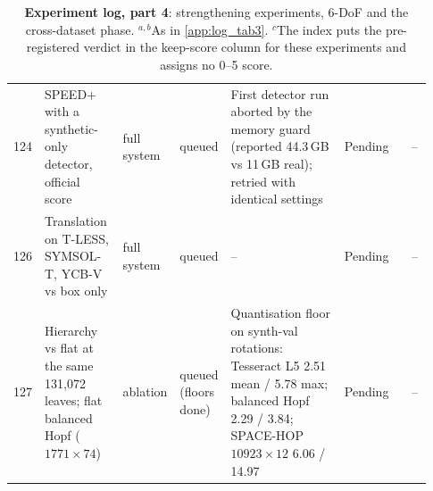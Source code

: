\begin{table}[p]
\begin{tabular}{@{}p{0.05\linewidth}p{0.19\linewidth}p{0.085\linewidth}p{0.075\linewidth}p{0.305\linewidth}p{0.17\linewidth}p{0.05\linewidth}@{}}
    124 & SPEED+ with a synthetic-only detector, official score & full system & queued & First detector run aborted by the memory guard (reported 44.3\,GB vs 11\,GB real); retried with identical settings & Pending & -- \\
    126 & Translation on T-LESS, SYMSOL-T, YCB-V vs box only & full system & queued & -- & Pending & -- \\
    127 & Hierarchy vs flat at the same 131,072 leaves; flat balanced Hopf ($1771\times74$) & ablation & queued (floors done) & Quantisation floor on synth-val rotations: Tesseract L5 2.51 mean / 5.78 max; balanced Hopf 2.29 / 3.84; SPACE-HOP $10923\times12$ 6.06 / 14.97 & Pending & -- \\
    \bottomrule
  \end{tabular}
  \caption{\textbf{Experiment log, part 4}: strengthening experiments, 6-DoF and the cross-dataset phase. $^{a,b}$As in \cref{app:log_tab3}. $^{c}$The index puts the pre-registered verdict in the keep-score column for these experiments and assigns no 0--5 score.}
  \label{app:log_tab4}
\end{table}

